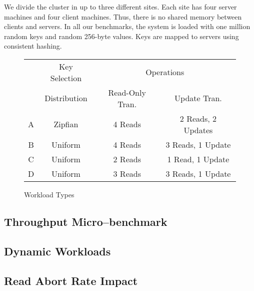We divide the cluster in up to three different sites. Each site has four server machines and four client machines. Thus, there is no shared memory between clients and servers. In all our benchmarks, the system is loaded with one million random keys and random 256-byte values. Keys are mapped to servers using consistent hashing.

\begin{figure}[h]
\begin{center}
\begin{tabularx}{0.75\linewidth}{c|c|c|c}
    & Key Selection
    & \multicolumn{2}{c}{Operations} \\
    & Distribution
    & Read-Only Tran.
    & Update Tran. \\ \hline
    A & Zipfian & 4 Reads & 2 Reads, 2 Updates \\
    B & Uniform & 4 Reads & 3 Reads, 1 Update \\
    C & Uniform & 2 Reads & 1 Read, 1 Update \\
    D & Uniform & 3 Reads & 3 Reads, 1 Update \\
\end{tabularx}
\end{center}
\caption{Workload Types }
\label{fig:workload-types}
\end{figure}


\subsection{Throughput Micro--benchmark}

\subsection{Dynamic Workloads}

\subsection{Read Abort Rate Impact}

